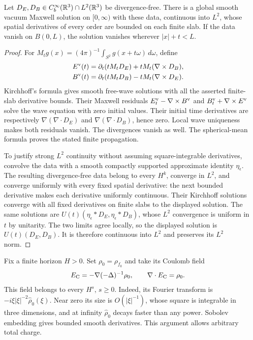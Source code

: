 \begin{lemma}\label{cont:vacuum}
Let $D_E,D_B\in C_b^\infty(\mathbb R^3)\cap L^2(\mathbb R^3)$ be divergence-free.
There is a global smooth vacuum Maxwell solution on $[0,\infty)$ with these data,
continuous into $L^2$, whose spatial derivatives of every order are
bounded on each finite slab.  If the data vanish on $B(0,L)$, the
solution vanishes wherever $|x|+t<L$.
\end{lemma}
\begin{proof}
For $M_tg(x)=(4\pi)^{-1}\int_{S^2}g(x+t\omega)\,d\omega$, define
\begin{align*}
 E^{\rm v}(t)&=\partial_t(tM_tD_E)+tM_t(\nabla\times D_B),\\
 B^{\rm v}(t)&=\partial_t(tM_tD_B)-tM_t(\nabla\times D_E).
\end{align*}
Kirchhoff's formula gives smooth free-wave solutions with all the
asserted finite-slab derivative bounds.  Their Maxwell residuals
$E^{\rm v}_t-\nabla\times B^{\rm v}$ and
$B^{\rm v}_t+\nabla\times E^{\rm v}$ solve the wave equation with
zero initial values.  Their initial time derivatives are respectively
$\nabla(\nabla\cdot D_E)$ and $\nabla(\nabla\cdot D_B)$, hence zero.
Local wave uniqueness makes both residuals vanish.  The divergences
vanish as well.  The spherical-mean formula proves the stated finite
propagation.

To justify strong $L^2$ continuity without assuming square-integrable
derivatives, convolve the data with a smooth compactly supported
approximate identity $\eta_\epsilon$.  The resulting divergence-free
data belong to every $H^k$, converge in $L^2$, and converge uniformly
with every fixed spatial derivative: the next bounded derivative makes
each derivative uniformly continuous.  Their Kirchhoff solutions
converge with all fixed derivatives on finite slabs to the displayed
solution.  The same solutions are $U(t)(\eta_\epsilon*D_E,
\eta_\epsilon*D_B)$, whose $L^2$ convergence is uniform in $t$ by
unitarity.  The two limits agree locally, so the displayed solution is
$U(t)(D_E,D_B)$.  It is therefore continuous into $L^2$ and preserves
its $L^2$ norm.
\end{proof}

Fix a finite horizon $H>0$.  Set $\rho_0=\rho_{f_0}$ and take its
Coulomb field
\begin{equation}\label{cont:coulomb}
 E_{\rm C}=-\nabla(-\Delta)^{-1}\rho_0,
 \qquad \nabla\cdot E_{\rm C}=\rho_0.
\end{equation}
This field belongs to every $H^s$, $s\ge0$.  Indeed, its Fourier
transform is $-i\xi|\xi|^{-2}\widehat\rho_0(\xi)$.
Near zero its size is $O(|\xi|^{-1})$, whose square is integrable in
three dimensions, and at infinity $\widehat\rho_0$ decays faster than
any power.  Sobolev embedding gives bounded smooth derivatives.
This argument allows arbitrary total charge.

